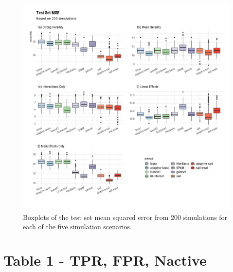 \documentclass[12pt,letter]{article}\usepackage[]{graphicx}\usepackage[]{color}
\newenvironment{knitrout}{}{} %
\begin{document}
\begin{knitrout}\scriptsize
{}\color{fgcolor}\begin{figure}[h]

{\centering \includegraphics[width=1\linewidth]{figure/plot-mse-sim-1} 

}

\caption[Boxplots of the test set mean squared error from 200 simulations for each of the five simulation scenarios]{Boxplots of the test set mean squared error from 200 simulations for each of the five simulation scenarios.}\label{fig:plot-mse-sim}
\end{figure}

\end{knitrout}



\section{Table 1 - TPR, FPR, Nactive}


%
%
%

\end{document}
